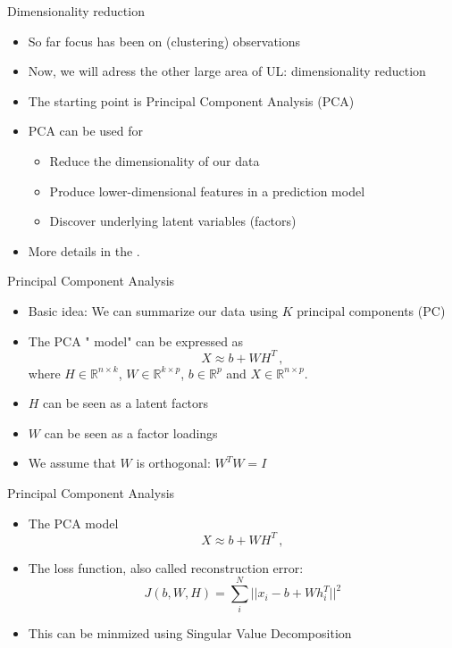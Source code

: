\documentclass[10pt]{beamer}
\begin{document}
\begin{frame}{Dimensionality reduction}

\begin{itemize}
\item So far focus has been on (clustering) {\color{uured} observations}
\item Now, we will adress the other large area of UL: {\color{uured} dimensionality reduction}\pause
\item The starting point is {\color{uured} Principal Component Analysis} (PCA)
\item PCA can be used for
\begin{itemize}
\item {\color{uured} Reduce the dimensionality} of our data
\item {\color{uured} Produce lower-dimensional features} in a prediction model
\item {\color{uured} Discover underlying latent variables} (factors)
\end{itemize}
\pause
\item More details in the .
\end{itemize}

\end{frame}

\begin{frame}{Principal Component Analysis}

\begin{itemize}
\item {\color{uured} Basic idea}: We can summarize our data using $K$ principal components (PC)
\item The PCA "{\color{uured} model}" can be expressed as
\[
X \approx b +  W H^T\,,
\]
where $H \in \mathbb{R}^{n \times k}$, $W \in \mathbb{R}^{k \times p}$, $b \in \mathbb{R}^{p}$ and $X \in \mathbb{R}^{n \times p}$.
\item $H$ can be seen as a {\color{uured} latent factors}
\pause
\item $W$ can be seen as a {\color{uured} factor loadings}
\pause
\item We assume that $W$ is orthogonal: $W^T W = I$
\end{itemize}

\end{frame}

\begin{frame}{Principal Component Analysis}

\begin{itemize}
\item The PCA model
\[
X \approx b +  W H^T\,,
\]
\item The loss function, also called {\color{uured} reconstruction error}:
\[
J(b,W,H) = \sum_i^N ||x_i - b +  W h_i^T||^2
\]
\pause
\item This can be minmized using {\color{uured} Singular Value Decomposition}
\end{itemize}

\end{frame}
\end{document}
